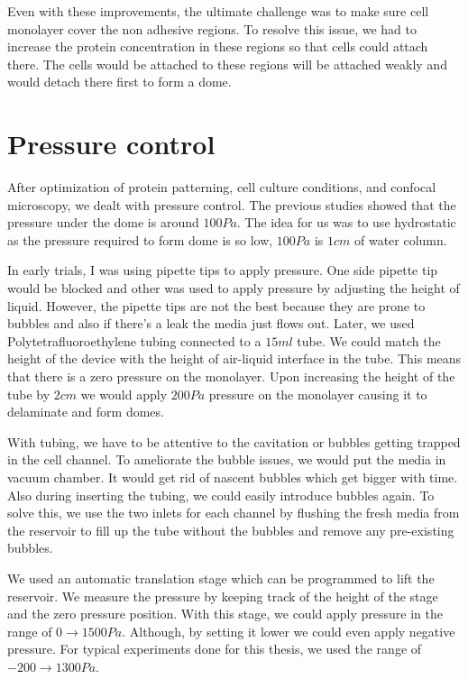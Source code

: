 Even with these improvements, the ultimate challenge was to make sure
cell monolayer cover the non adhesive regions. To resolve this issue, we
had to increase the protein concentration in these regions so that cells
could attach there. The cells would be attached to these regions will be
attached weakly and would detach there first to form a dome.

\hypertarget{pressure-control}{%
\section{Pressure control}\label{pressure-control}}

After optimization of protein patterning, cell culture conditions, and
confocal microscopy, we dealt with pressure control. The previous
studies showed that the pressure under the dome is around \(100Pa\). The
idea for us was to use hydrostatic as the pressure required to form dome
is so low, \(100Pa\) is \(1cm\) of water column.

In early trials, I was using pipette tips to apply pressure. One side
pipette tip would be blocked and other was used to apply pressure by
adjusting the height of liquid. However, the pipette tips are not the
best because they are prone to bubbles and also if there's a leak the
media just flows out. Later, we used Polytetrafluoroethylene tubing
connected to a \(15ml\) tube. We could match the height of the device
with the height of air-liquid interface in the tube. This means that
there is a zero pressure on the monolayer. Upon increasing the height of
the tube by \(2cm\) we would apply \(200Pa\) pressure on the monolayer
causing it to delaminate and form domes.

With tubing, we have to be attentive to the cavitation or bubbles
getting trapped in the cell channel. To ameliorate the bubble issues, we
would put the media in vacuum chamber. It would get rid of nascent
bubbles which get bigger with time. Also during inserting the tubing, we
could easily introduce bubbles again. To solve this, we use the two
inlets for each channel by flushing the fresh media from the reservoir
to fill up the tube without the bubbles and remove any pre-existing
bubbles.

We used an automatic translation stage which can be programmed to lift
the reservoir. We measure the pressure by keeping track of the height of
the stage and the zero pressure position. With this stage, we could
apply pressure in the range of \(0\rightarrow 1500Pa\). Although, by
setting it lower we could even apply negative pressure. For typical
experiments done for this thesis, we used the range of
\(-200\rightarrow 1300Pa\).

